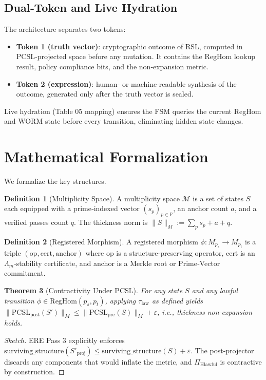 \documentclass[11pt,a4paper]{article}
\newtheorem{theorem}{Theorem}[section]
\theoremstyle{definition}
\newtheorem{definition}[theorem]{Definition}
\theoremstyle{remark}
\begin{document}
\subsection{Dual‑Token and Live Hydration}
\label{subsec:dual}
The architecture separates two tokens:
\begin{itemize}[noitemsep]
    \item \textbf{Token 1 (truth vector)}: cryptographic outcome of RSL, computed in PCSL‑projected space before any mutation. It contains the RegHom lookup result, policy compliance bits, and the non‑expansion metric.
    \item \textbf{Token 2 (expression)}: human‑ or machine‑readable synthesis of the outcome, generated only after the truth vector is sealed.
\end{itemize}
Live hydration (Table 05 mapping) ensures the FSM queries the current RegHom and WORM state before every transition, eliminating hidden state changes.

\section{Mathematical Formalization}
\label{sec:math}
We formalize the key structures.

\begin{definition}[Multiplicity Space]
A multiplicity space $\mathcal{M}$ is a set of states $S$ each equipped with a prime‑indexed vector $(s_p)_{p \in \mathbb{P}}$, an anchor count $a$, and a verified passes count $q$. The thickness norm is $\|S\|_M := \sum_p s_p + a + q$.
\end{definition}

\begin{definition}[Registered Morphism]
A registered morphism $\phi: M_{p_s} \to M_{p_t}$ is a triple $(\text{op}, \text{cert}, \text{anchor})$ where op is a structure‑preserving operator, cert is an $\Lambda_m$‑stability certificate, and anchor is a Merkle root or Prime‑Vector commitment.
\end{definition}

\begin{theorem}[Contractivity Under PCSL]
For any state $S$ and any lawful transition $\phi \in \text{RegHom}(p_s, p_t)$, applying $\tau_\text{law}$ as defined yields $\|\text{PCSL}_\text{post}(S')\|_M \le \|\text{PCSL}_\text{pre}(S)\|_M + \varepsilon$, i.e., thickness non‑expansion holds.
\end{theorem}
\begin{proof}[Sketch]
ERE Pass 3 explicitly enforces $\text{surviving\_structure}(S'_\text{proj}) \le \text{surviving\_structure}(S) + \varepsilon$. The post‑projector discards any components that would inflate the metric, and $\Pi_\text{Hlawful}$ is contractive by construction.
\end{proof}
\end{document}
